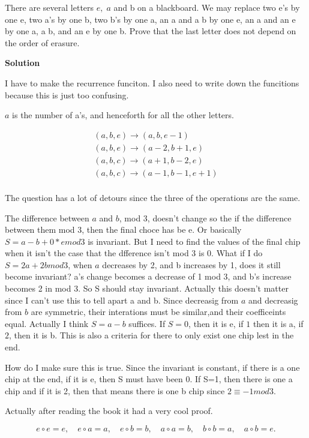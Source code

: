 \documentclass[12pt,tikz,border=10pt]{article}
\theoremstyle{definition}
\theoremstyle{remark}
\begin{document}
There are several letters $e,\;a$ and b on a blackboard. We may replace two e's by one
e, two a's by one b, two b's by one a, an a and a b by one e, an a and an e by one
a, a b, and an e by one b. Prove that the last letter does not depend on the order of
erasure.

\textbf{Solution}

I have to make the recurrence funciton. I also need to write down the funcitions because this 
is just too confusing.

$a$ is the number of a's, and henceforth for all the other letters.

\begin{align*}
    (a,b,e) \rightarrow (a,b,e-1)\\
    (a,b,e) \rightarrow (a-2,b+1,e)\\
    (a,b,c) \rightarrow (a+1,b-2,e)\\
    (a,b,c) \rightarrow (a-1,b-1,e+1)\\
\end{align*}

The question has a lot of detours since the three of the operations are the same.

The difference between $a$ and $b$, mod 3, doesn't change so the if the difference between them mod 3,
then the final choce has be e. Or basically $S=a-b+0*e mod 3$ is invariant. But I need to find the 
values of the final chip when it isn't the case that the dfference isn't mod 3 is 0. What if I do $S=2a+2b mod 3$,
when $a$ decreases by 2, and b increases by 1, does it still become invariant? a's change becomes a decrease of 1 mod 3, and
b's increase becomes 2 in mod 3. So S should stay invariant. Actually this doesn't matter 
since I can't use this to tell apart a and b. Since decreasig from $a$ and decreasig from $b$ are symmetric,
their interations must be similar,and their coefficeints equal. Actually I think $S=a-b$ suffices.
If $S=0$, then it is e, if $1$ then it is a, if $2$, then it is b. This is also a criteria for there to only exist one chip lest in the end.

How do I make sure this is true. Since the invariant is constant, if there is a one chip at the end, if it is e, then S must have been 0. 
If S=1, then there is one a chip and if it is 2, then that means there is one b chip since $2 \equiv -1 mod 3$. 

Actually after reading the book it had a very cool proof. 


\[
e \circ e = e, \quad e \circ a = a, \quad e \circ b = b, \quad a \circ a = b, \quad b \circ b = a, \quad a \circ b = e.
\]
\end{document}
